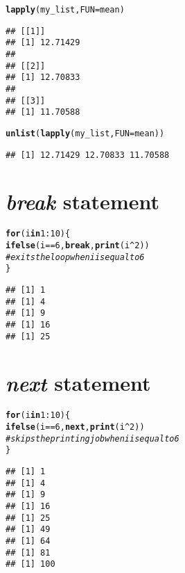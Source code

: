 \documentclass[11pt, a4paper]{article}\usepackage[]{graphicx}\usepackage[]{xcolor}
\makeatletter
\newcommand{\hlnum}[1]{\textcolor[rgb]{0.686,0.059,0.569}{#1}}%
\newcommand{\hlcom}[1]{\textcolor[rgb]{0.678,0.584,0.686}{\textit{#1}}}%
\newcommand{\hlopt}[1]{\textcolor[rgb]{0,0,0}{#1}}%
\newcommand{\hldef}[1]{\textcolor[rgb]{0.345,0.345,0.345}{#1}}%
\newcommand{\hlkwa}[1]{\textcolor[rgb]{0.161,0.373,0.58}{\textbf{#1}}}%
\newcommand{\hlkwc}[1]{\textcolor[rgb]{0.333,0.667,0.333}{#1}}%
\newcommand{\hlkwd}[1]{\textcolor[rgb]{0.737,0.353,0.396}{\textbf{#1}}}%
\newenvironment{kframe}{%
 \def\at@end@of@kframe{}%
 \ifinner\ifhmode%
  \def\at@end@of@kframe{\end{minipage}}%
  \begin{minipage}{\columnwidth}%
 \fi\fi%
 \def\FrameCommand##1{\hskip\@totalleftmargin \hskip-\fboxsep
 \colorbox{shadecolor}{##1}\hskip-\fboxsep
     \hskip-\linewidth \hskip-\@totalleftmargin \hskip\columnwidth}%
 \MakeFramed {\advance\hsize-\width
   \@totalleftmargin\z@ \linewidth\hsize
   \@setminipage}}%
 {\par\unskip\endMakeFramed%
 \at@end@of@kframe}
\newenvironment{knitrout}{}{} %
\makeatother
\begin{document}
\begin{knitrout}
\color{fgcolor}\begin{kframe}
\begin{alltt}
\hlkwd{lapply}\hldef{(my_list,} \hlkwc{FUN} \hldef{= mean)}
\end{alltt}
\begin{verbatim}
## [[1]]
## [1] 12.71429
## 
## [[2]]
## [1] 12.70833
## 
## [[3]]
## [1] 11.70588
\end{verbatim}
\begin{alltt}
\hlkwd{unlist}\hldef{(}\hlkwd{lapply}\hldef{(my_list,} \hlkwc{FUN} \hldef{= mean))}
\end{alltt}
\begin{verbatim}
## [1] 12.71429 12.70833 11.70588
\end{verbatim}
\end{kframe}
\end{knitrout}

\section{\textit{break} statement}

\begin{knitrout}
\color{fgcolor}\begin{kframe}
\begin{alltt}
\hlkwa{for} \hldef{(i} \hlkwa{in} \hlnum{1}\hlopt{:}\hlnum{10}\hldef{) \{}
    \hlkwd{ifelse}\hldef{(i} \hlopt{==} \hlnum{6}\hldef{,} \hlkwa{break}\hldef{,} \hlkwd{print}\hldef{(i}\hlopt{^}\hlnum{2}\hldef{))}
    \hlcom{# exits the loop when i is equal to 6}
\hldef{\}}
\end{alltt}
\begin{verbatim}
## [1] 1
## [1] 4
## [1] 9
## [1] 16
## [1] 25
\end{verbatim}
\end{kframe}
\end{knitrout}

\section{\textit{next} statement}

\begin{knitrout}
\color{fgcolor}\begin{kframe}
\begin{alltt}
\hlkwa{for} \hldef{(i} \hlkwa{in} \hlnum{1}\hlopt{:}\hlnum{10}\hldef{) \{}
    \hlkwd{ifelse}\hldef{(i} \hlopt{==} \hlnum{6}\hldef{,} \hlkwa{next}\hldef{,} \hlkwd{print}\hldef{(i}\hlopt{^}\hlnum{2}\hldef{))}
    \hlcom{# skips the printing job when i is equal to 6}
\hldef{\}}
\end{alltt}
\begin{verbatim}
## [1] 1
## [1] 4
## [1] 9
## [1] 16
## [1] 25
## [1] 49
## [1] 64
## [1] 81
## [1] 100
\end{verbatim}
\end{kframe}
\end{knitrout}
\end{document}
